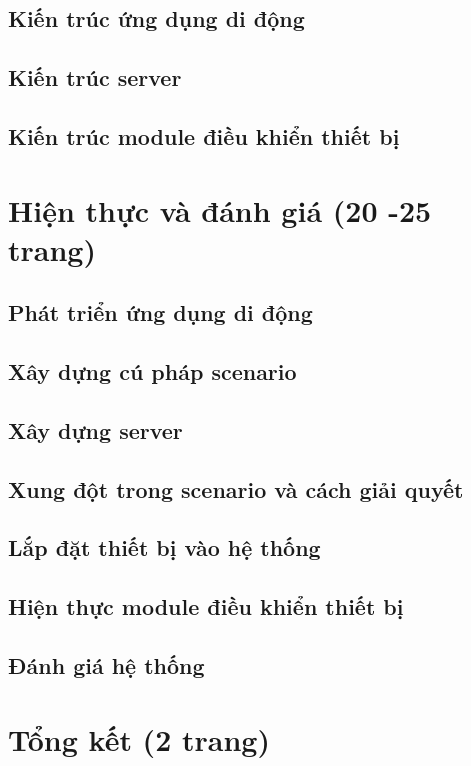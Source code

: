 \documentclass[11pt,a4paper,oneside]{book}
\begin{document}
\section{Kiến trúc ứng dụng di động}
\newpage
\section{Kiến trúc server}
\newpage
\section{Kiến trúc module điều khiển thiết bị}

\chapter{Hiện thực và đánh giá  (20 -25 trang)}
\newpage
\section{Phát triển ứng dụng di động}
\newpage
\section{Xây dựng cú pháp scenario}
\newpage
\section{Xây dựng server}
\newpage
\section{Xung đột trong scenario và cách giải quyết}
\newpage
\section{Lắp đặt thiết bị vào hệ thống}
\newpage
\section{Hiện thực module điều khiển thiết bị}
\newpage
\section{Đánh giá hệ thống}

\chapter{Tổng kết (2 trang)} 
\end{document}
